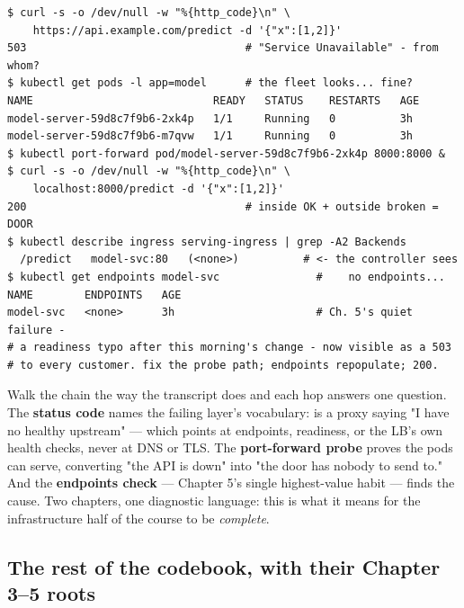 \begin{terminalbox}
\begin{Verbatim}[breaklines=true,breakanywhere=true,fontsize=\small,formatcom=\color{tbbtermfg},codes=\tbbcodeactive]
$ curl -s -o /dev/null -w "%{http_code}\n" \
    https://api.example.com/predict -d '{"x":[1,2]}'
503                                  # "Service Unavailable" - from whom?
$ kubectl get pods -l app=model      # the fleet looks... fine?
NAME                            READY   STATUS    RESTARTS   AGE
model-server-59d8c7f9b6-2xk4p   1/1     Running   0          3h
model-server-59d8c7f9b6-m7qvw   1/1     Running   0          3h
$ kubectl port-forward pod/model-server-59d8c7f9b6-2xk4p 8000:8000 &
$ curl -s -o /dev/null -w "%{http_code}\n" \
    localhost:8000/predict -d '{"x":[1,2]}'
200                                  # inside OK + outside broken = DOOR
$ kubectl describe ingress serving-ingress | grep -A2 Backends
  /predict   model-svc:80   (<none>)          # <- the controller sees
$ kubectl get endpoints model-svc               #    no endpoints...
NAME        ENDPOINTS   AGE
model-svc   <none>      3h                      # Ch. 5's quiet failure -
# a readiness typo after this morning's change - now visible as a 503
# to every customer. fix the probe path; endpoints repopulate; 200.
\end{Verbatim}
\end{terminalbox}

Walk the chain the way the transcript does and each hop answers one question. The \textbf{status code} names the failing layer's vocabulary:  is a proxy saying "I have no healthy upstream" — which points at endpoints, readiness, or the LB's own health checks, never at DNS or TLS. The \textbf{port-forward probe} proves the pods can serve, converting "the API is down" into "the door has nobody to send to." And the \textbf{endpoints check} — Chapter 5's single highest-value habit — finds the cause. Two chapters, one diagnostic language: this is what it means for the infrastructure half of the course to be \textit{complete}.

\subsection*{The rest of the codebook, with their Chapter 3–5 roots}


